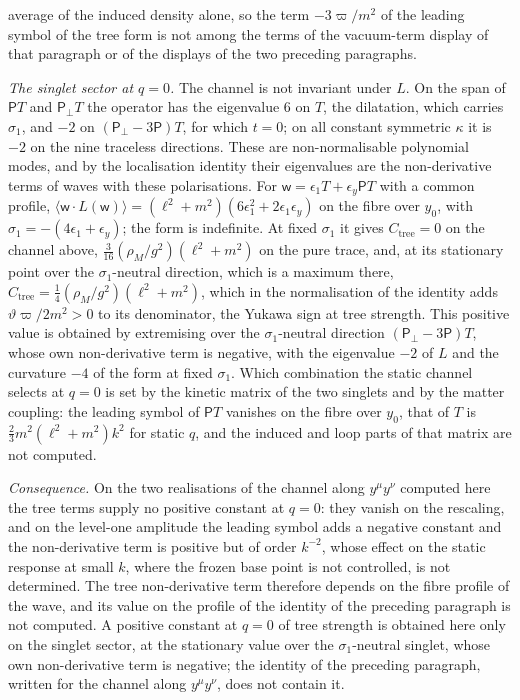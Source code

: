 average of the induced density alone, so the term \(-3\varpi/m^2\) of the leading symbol of the tree form is not among the terms of the vacuum-term display of that paragraph or of the displays of the two preceding paragraphs.

\emph{The singlet sector at \(q=0\).} The channel is not invariant under \(L\). On the span of \(\mathsf PT\) and \(\mathsf P_\perp T\) the operator has the eigenvalue \(6\) on \(T\), the dilatation, which carries \(\sigma_1\), and \(-2\) on \((\mathsf P_\perp-3\mathsf P)T\), for which \(t=0\); on all constant symmetric \(\kappa\) it is \(-2\) on the nine traceless directions. These are non-normalisable polynomial modes, and by the localisation identity their eigenvalues are the non-derivative terms of waves with these polarisations. For \(\mathsf w=\epsilon_1T+\epsilon_y\mathsf PT\) with a common profile, \(\langle\mathsf w\cdot L(\mathsf w)\rangle=(\ell^2+m^2)(6\epsilon_1^2+2\epsilon_1\epsilon_y)\) on the fibre over \(y_0\), with \(\sigma_1=-(4\epsilon_1+\epsilon_y)\); the form is indefinite. At fixed \(\sigma_1\) it gives \(C_{\mathrm{tree}}=0\) on the channel above, \(\tfrac3{16}(\rho_M/g^2)(\ell^2+m^2)\) on the pure trace, and, at its stationary point over the \(\sigma_1\)-neutral direction, which is a maximum there, \(C_{\mathrm{tree}}=\tfrac14(\rho_M/g^2)(\ell^2+m^2)\), which in the normalisation of the identity adds \(\vartheta\varpi/2m^2>0\) to its denominator, the Yukawa sign at tree strength. This positive value is obtained by extremising over the \(\sigma_1\)-neutral direction \((\mathsf P_\perp-3\mathsf P)T\), whose own non-derivative term is negative, with the eigenvalue \(-2\) of \(L\) and the curvature \(-4\) of the form at fixed \(\sigma_1\). Which combination the static channel selects at \(q=0\) is set by the kinetic matrix of the two singlets and by the matter coupling: the leading symbol of \(\mathsf PT\) vanishes on the fibre over \(y_0\), that of \(T\) is \(\tfrac23m^2(\ell^2+m^2)k^2\) for static \(q\), and the induced and loop parts of that matrix are not computed.

\emph{Consequence.} On the two realisations of the channel along \(y^\mu y^\nu\) computed here the tree terms supply no positive constant at \(q=0\): they vanish on the rescaling, and on the level-one amplitude the leading symbol adds a negative constant and the non-derivative term is positive but of order \(k^{-2}\), whose effect on the static response at small \(k\), where the frozen base point is not controlled, is not determined. The tree non-derivative term therefore depends on the fibre profile of the wave, and its value on the profile of the identity of the preceding paragraph is not computed. A positive constant at \(q=0\) of tree strength is obtained here only on the singlet sector, at the stationary value over the \(\sigma_1\)-neutral singlet, whose own non-derivative term is negative; the identity of the preceding paragraph, written for the channel along \(y^\mu y^\nu\), does not contain it.

